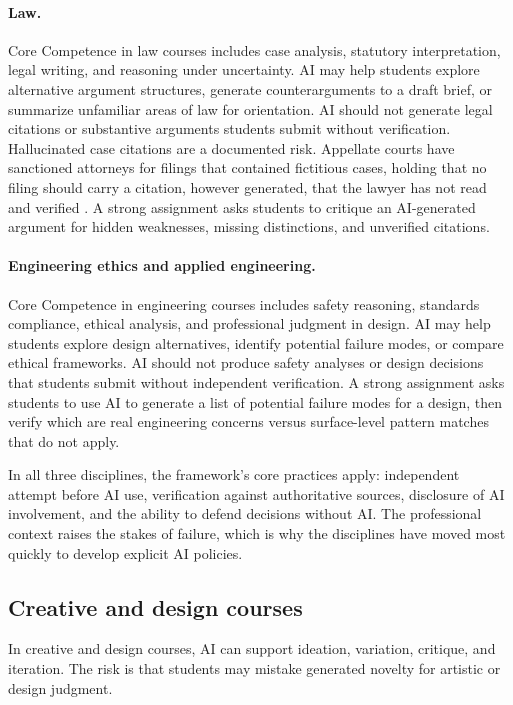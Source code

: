 \documentclass{SIAMbook2023}
\begin{document}
\paragraph{Law.} Core Competence in law courses includes case analysis, statutory interpretation, legal writing, and reasoning under uncertainty. AI may help students explore alternative argument structures, generate counterarguments to a draft brief, or summarize unfamiliar areas of law for orientation. AI should not generate legal citations or substantive arguments students submit without verification. Hallucinated case citations are a documented risk. Appellate courts have sanctioned attorneys for filings that contained fictitious cases, holding that no filing should carry a citation, however generated, that the lawyer has not read and verified \citep{whiting2026sixth}. A strong assignment asks students to critique an AI-generated argument for hidden weaknesses, missing distinctions, and unverified citations.

\paragraph{Engineering ethics and applied engineering.} Core Competence in engineering courses includes safety reasoning, standards compliance, ethical analysis, and professional judgment in design. AI may help students explore design alternatives, identify potential failure modes, or compare ethical frameworks. AI should not produce safety analyses or design decisions that students submit without independent verification. A strong assignment asks students to use AI to generate a list of potential failure modes for a design, then verify which are real engineering concerns versus surface-level pattern matches that do not apply.

In all three disciplines, the framework's core practices apply: independent attempt before AI use, verification against authoritative sources, disclosure of AI involvement, and the ability to defend decisions without AI. The professional context raises the stakes of failure, which is why the disciplines have moved most quickly to develop explicit AI policies.

\subsection{Creative and design courses}
\label{i:subsec:creative}%

In creative and design courses, AI can support ideation, variation, critique, and iteration. The risk is that students may mistake generated novelty for artistic or design judgment.
\end{document}
